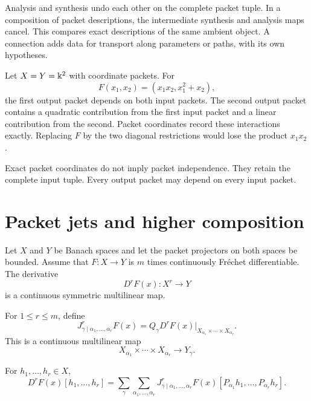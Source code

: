 \begin{keyidea}[title={Exactness by cancellation}]
Analysis and synthesis undo each other on the complete packet tuple. In a composition of packet descriptions, the intermediate synthesis and analysis maps cancel. This compares exact descriptions of the same ambient object. A connection adds data for transport along parameters or paths, with its own hypotheses.
\end{keyidea}

\begin{example}\label{ex:mixed_quadratic}
Let $X=Y=\Bbbk^2$ with coordinate packets.  For
\[
F(x_1,x_2)=(x_1x_2,x_1^2+x_2),
\]
the first output packet depends on both input packets.  The second output packet contains a quadratic contribution from the first input packet and a linear contribution from the second.  Packet coordinates record these interactions exactly.  Replacing $F$ by the two diagonal restrictions would lose the product $x_1x_2$.
\end{example}

\begin{remark}\label{rem:coordinates_not_independence}
Exact packet coordinates do not imply packet independence.  They retain the complete input tuple.  Every output packet may depend on every input packet.
\end{remark}

\section{Packet jets and higher composition}\label{sec:packet_jets}

Let $X$ and $Y$ be Banach spaces and let the packet projectors on both spaces be bounded.  Assume that $F:X\to Y$ is $m$ times continuously Fr\'echet differentiable.  The derivative
\[
D^rF(x):X^r\longrightarrow Y
\]
is a continuous symmetric multilinear map.

\begin{definition}\label{def:packet_jet}
For $1\le r\le m$, define
\[
J^{r}_{\gamma\mid\alpha_1,\ldots,\alpha_r}F(x)
=
Q_\gamma D^rF(x)
\big|_{X_{\alpha_1}\times\cdots\times X_{\alpha_r}}.
\]
This is a continuous multilinear map
\[
X_{\alpha_1}\times\cdots\times X_{\alpha_r}
\longrightarrow
Y_\gamma.
\]
\end{definition}

\begin{theorem}\label{thm:jet_reconstruction}
For $h_1,\ldots,h_r\in X$,
\[
D^rF(x)[h_1,\ldots,h_r]
=
\sum_{\gamma}
\sum_{\alpha_1,\ldots,\alpha_r}
J^{r}_{\gamma\mid\alpha_1,\ldots,\alpha_r}F(x)
[P_{\alpha_1}h_1,\ldots,P_{\alpha_r}h_r].
\]
\end{theorem}

